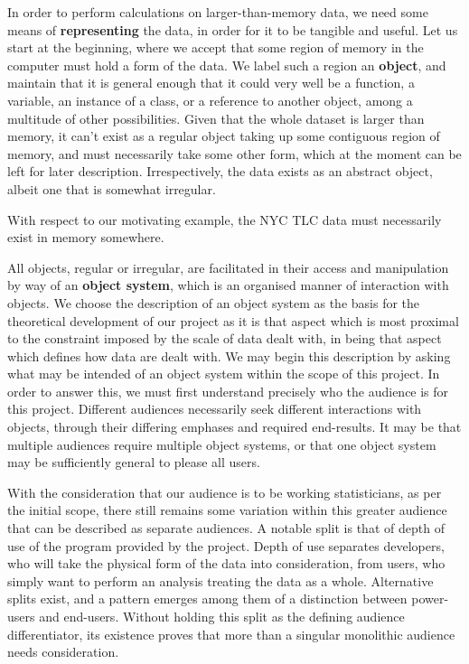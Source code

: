 In order to perform calculations on larger-than-memory data, we need some means of \textbf{representing} the data, in order for it to be tangible and useful.
Let us start at the beginning, where we accept that some region of memory in the computer must hold a form of the data.
We label such a region an \textbf{object}, and maintain that it is general enough that it could very well be a function, a variable, an instance of a class, or a reference to another object, among a multitude of other possibilities.
Given that the whole dataset is larger than memory, it can't exist as a regular object taking up some contiguous region of memory, and must necessarily take some other form, which at the moment can be left for later description.
Irrespectively, the data exists as an abstract object, albeit one that is somewhat irregular.

With respect to our motivating example, the NYC TLC data must necessarily exist in memory somewhere.

All objects, regular or irregular, are facilitated in their access and manipulation by way of an \textbf{object system}, which is an organised manner of interaction with objects.
We choose the description of an object system as the basis for the theoretical development of our project as it is that aspect which is most proximal to the constraint imposed by the scale of data dealt with, in being that aspect which defines how data are dealt with.
We may begin this description by asking what may be intended of an object system within the scope of this project.
In order to answer this, we must first understand precisely who the audience is for this project.
Different audiences necessarily seek different interactions with objects, through their differing emphases and required end-results.
It may be that multiple audiences require multiple object systems, or that one object system may be sufficiently general to please all users.

With the consideration that our audience is to be working statisticians, as per the initial scope, there still remains some variation within this greater audience that can be described as separate audiences.
A notable split is that of depth of use of the program provided by the project.
Depth of use separates developers, who will take the physical form of the data into consideration, from users, who simply want to perform an analysis treating the data as a whole.
Alternative splits exist, and a pattern emerges among them of a distinction between power-users and end-users.
Without holding this split as the defining audience differentiator, its existence proves that more than a singular monolithic audience needs consideration.

